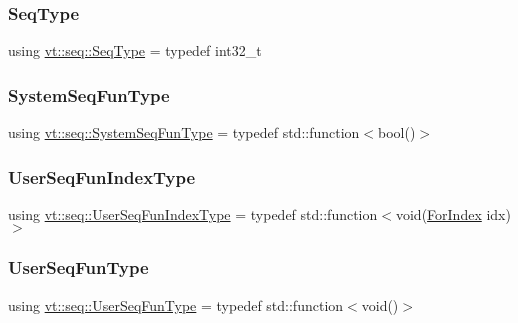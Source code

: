\mbox{\label{namespacevt_1_1seq_a3b612da217ac669d39c159f134ab8434}} 
\subsubsection{\texorpdfstring{Seq\+Type}{SeqType}}
{\footnotesize\ttfamily using \hyperlink{namespacevt_1_1seq_a3b612da217ac669d39c159f134ab8434}{vt\+::seq\+::\+Seq\+Type} = typedef int32\+\_\+t}

\mbox{\label{namespacevt_1_1seq_a80eeb50c74a4a3bd46fcf4d5213c5ebe}} 
\subsubsection{\texorpdfstring{System\+Seq\+Fun\+Type}{SystemSeqFunType}}
{\footnotesize\ttfamily using \hyperlink{namespacevt_1_1seq_a80eeb50c74a4a3bd46fcf4d5213c5ebe}{vt\+::seq\+::\+System\+Seq\+Fun\+Type} = typedef std\+::function$<$bool()$>$}

\mbox{\label{namespacevt_1_1seq_ab8466502cdb46b9f1d17e3e5630ed65a}} 
\subsubsection{\texorpdfstring{User\+Seq\+Fun\+Index\+Type}{UserSeqFunIndexType}}
{\footnotesize\ttfamily using \hyperlink{namespacevt_1_1seq_ab8466502cdb46b9f1d17e3e5630ed65a}{vt\+::seq\+::\+User\+Seq\+Fun\+Index\+Type} = typedef std\+::function$<$void(\hyperlink{namespacevt_1_1seq_a6c570c39bac8f93bafe0bf8a0db8c798}{For\+Index} idx)$>$}

\mbox{\label{namespacevt_1_1seq_aeb4674d25dcb5d27248b68ec83fad2b6}} 
\subsubsection{\texorpdfstring{User\+Seq\+Fun\+Type}{UserSeqFunType}}
{\footnotesize\ttfamily using \hyperlink{namespacevt_1_1seq_aeb4674d25dcb5d27248b68ec83fad2b6}{vt\+::seq\+::\+User\+Seq\+Fun\+Type} = typedef std\+::function$<$void()$>$}

